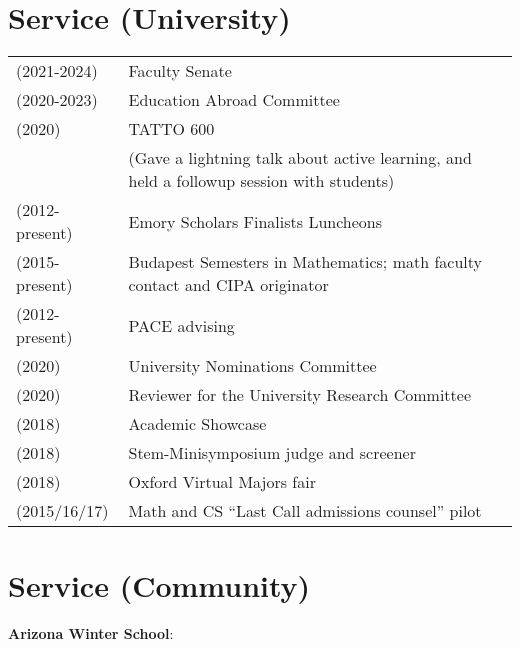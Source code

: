 \documentclass[margin,line]{res}
\begin{document}
\begin{resume}
\begin{tabular}{ll}
\end{tabular}


\section{\sc Service (University)}

\begin{tabular}{ll}
  (2021-2024) & Faculty Senate   \\
  (2020-2023) & Education Abroad Committee   \\
  (2020) & TATTO 600 \\
         & (Gave a lightning talk about active learning, and held a followup session with students)  \\    
 (2012-present) & Emory Scholars Finalists Luncheons  \\  
 (2015-present) & Budapest Semesters in Mathematics; math faculty contact and CIPA originator   \\
  (2012-present) & PACE advising  \\
  (2020) & University Nominations Committee \\
 (2020) & Reviewer for the University Research Committee \\  
 (2018) & Academic Showcase   \\
 (2018) & Stem-Minisymposium judge and screener  \\
 (2018) & Oxford Virtual Majors fair  \\
 (2015/16/17) & Math and CS ``Last Call admissions counsel'' pilot    \\

\end{tabular}


\section{\sc Service (Community)}
\textbf{Arizona Winter School}:
  \vspace*{-.15in}
  

\end{resume}
\end{document}
